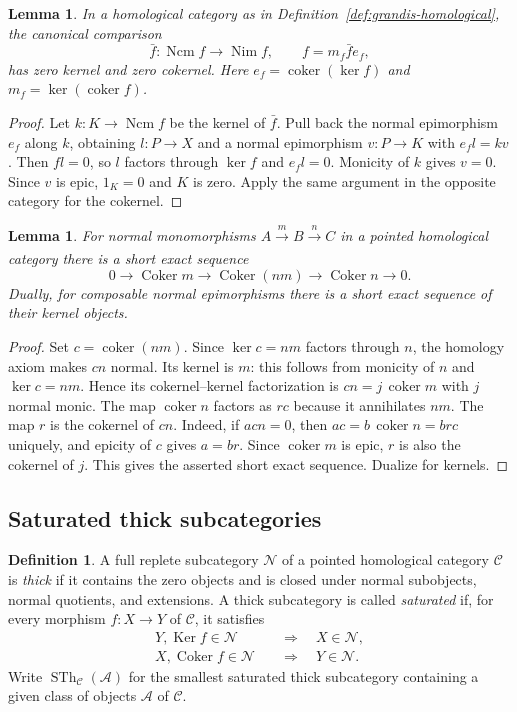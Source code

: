 \documentclass[11pt,reqno,a4paper]{amsart}
\newtheorem{lemma}[theorem]{Lemma}
\theoremstyle{definition}
\newtheorem{definition}[theorem]{Definition}
\theoremstyle{remark}
\DeclareMathOperator{\coker}{coker}
\newcommand{\C}{\mathcal{C}}
\newcommand{\N}{\mathcal{N}}
\newcommand{\0}{\mathbf{0}}
\renewcommand{\1}{\mathbf{1}}
\newcommand{\aar}[2][]{\xrightarrow[#1]{#2}}
\DeclareMathOperator{\Ker}{Ker}
\DeclareMathOperator{\Coker}{Coker}
\newcommand{\Nim}{\operatorname{Nim}}
\newcommand{\Ncm}{\operatorname{Ncm}}
\DeclareMathOperator{\SatTh}{STh}
\begin{document}
\begin{lemma}\label{di:lem:comparison}
In a homological category as in
Definition~\ref{def:grandis-homological}, the canonical comparison
\[
 \bar f:\Ncm f\longrightarrow\Nim f,
 \qquad f=m_f\bar f e_f,
\]
has zero kernel and zero cokernel. Here $e_f=\coker(\ker f)$ and $m_f=\ker(\coker f)$.
\end{lemma}
\begin{proof}
Let $k:K\to\Ncm f$ be the kernel of $\bar f$. Pull back the normal epimorphism $e_f$ along $k$, obtaining $l:P\to X$ and a normal epimorphism $v:P\to K$ with $e_fl=kv$. Then $fl=0$, so $l$ factors through $\ker f$ and $e_fl=0$. Monicity of $k$ gives $v=0$. Since $v$ is epic, $1_K=0$ and $K$ is zero. Apply the same argument in the opposite category for the cokernel.
\end{proof}

\begin{lemma}\label{di:lem:nested-normal}
For normal monomorphisms $A\aar{m}B\aar{n}C$ in a pointed homological category there is a short exact sequence
\[
 0\longrightarrow\Coker m\longrightarrow\Coker(nm)
   \longrightarrow\Coker n\longrightarrow0.
\]
Dually, for composable normal epimorphisms there is a short exact sequence of their kernel objects.
\end{lemma}
\begin{proof}
Set $c=\coker(nm)$. Since $\ker c=nm$ factors through $n$, the homology axiom makes $cn$ normal. Its kernel is $m$: this follows from monicity of $n$ and $\ker c=nm$. Hence its cokernel--kernel factorization is $cn=j\,\coker m$ with $j$ normal monic. The map $\coker n$ factors as $rc$ because it annihilates $nm$. The map $r$ is the cokernel of $cn$. Indeed, if $a cn=0$, then $ac=b\,\coker n=brc$ uniquely, and epicity of $c$ gives $a=br$. Since $\coker m$ is epic, $r$ is also the cokernel of $j$. This gives the asserted short exact sequence. Dualize for kernels.
\end{proof}

\subsection{Saturated thick subcategories}\label{di:sec:saturation}

\begin{definition}\label{di:def:saturated}
A full replete subcategory $\N$ of a pointed homological category $\C$ is \emph{thick} if it contains the zero objects and is closed under normal subobjects, normal quotients, and extensions. A thick subcategory is called \emph{saturated} if, for every morphism $f:X\to Y$ of $\C$, it satisfies
\begin{align}
 Y,\Ker f\in\N&\quad\Longrightarrow\quad X\in\N,\label{di:eq:satk}\\
 X,\Coker f\in\N&\quad\Longrightarrow\quad Y\in\N.\label{di:eq:satc}
\end{align}
Write $\SatTh_{\C}(\mathcal A)$ for the smallest saturated thick subcategory containing a given class of objects $\mathcal A$ of $\C$.
\end{definition}
\end{document}
